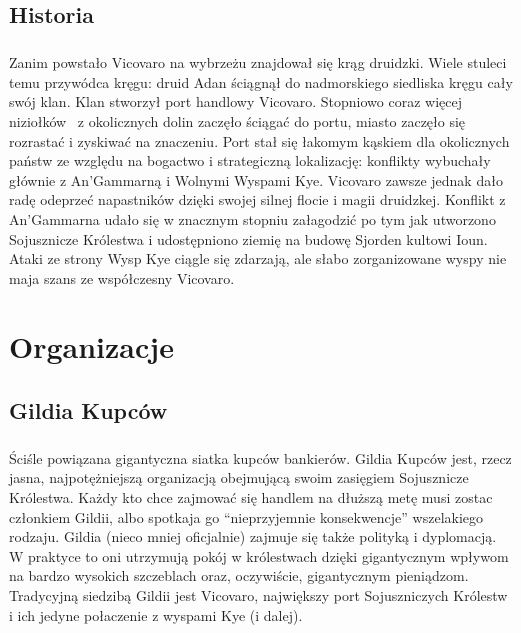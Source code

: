 \documentclass[10pt,twoside,twocolumn]{book}
\begin{document}
\section{Historia}
\paragraph{}
Zanim powstało Vicovaro na wybrzeżu znajdował się krąg druidzki. 
Wiele stuleci temu przywódca kręgu: druid Adan ściągnął do nadmorskiego siedliska kręgu cały swój klan. 
Klan stworzył port handlowy Vicovaro. 
Stopniowo coraz więcej niziołków  z okolicznych dolin zaczęło ściągać do portu, miasto zaczęło się rozrastać i zyskiwać na znaczeniu.
Port stał się łakomym kąskiem dla okolicznych państw ze względu na bogactwo i strategiczną lokalizację: konflikty wybuchały głównie z An'Gammarną i Wolnymi Wyspami Kye. 
Vicovaro zawsze jednak dało radę odeprzeć napastników dzięki swojej silnej flocie i magii druidzkej. 
Konflikt z An'Gammarna udało się w znacznym stopniu załagodzić po tym jak utworzono Sojusznicze Królestwa i udostępniono ziemię na budowę Sjorden kultowi Ioun. 
Ataki ze strony Wysp Kye ciągle się zdarzają, ale słabo zorganizowane wyspy nie maja szans ze współczesny Vicovaro.

\chapter{Organizacje}

\label{GildiaKupcow}
\section{Gildia Kupców}
\paragraph{}
Ściśle powiązana gigantyczna siatka kupców bankierów.
Gildia Kupców jest, rzecz jasna, najpotężniejszą organizacją obejmującą swoim zasięgiem Sojusznicze Królestwa.
Każdy kto chce zajmować się handlem na dłuższą metę musi zostac członkiem Gildii, albo spotkaja go “nieprzyjemnie konsekwencje” wszelakiego rodzaju.
Gildia (nieco mniej oficjalnie) zajmuje się także polityką i dyplomacją.
W praktyce to oni utrzymują pokój w królestwach dzięki gigantycznym wpływom na bardzo wysokich szczeblach oraz, oczywiście, gigantycznym pieniądzom.
Tradycyjną siedzibą Gildii jest Vicovaro, największy port Sojuszniczych Królestw i ich jedyne połaczenie z wyspami Kye (i dalej).

\label{KonfraterieMagow}
\end{document}
